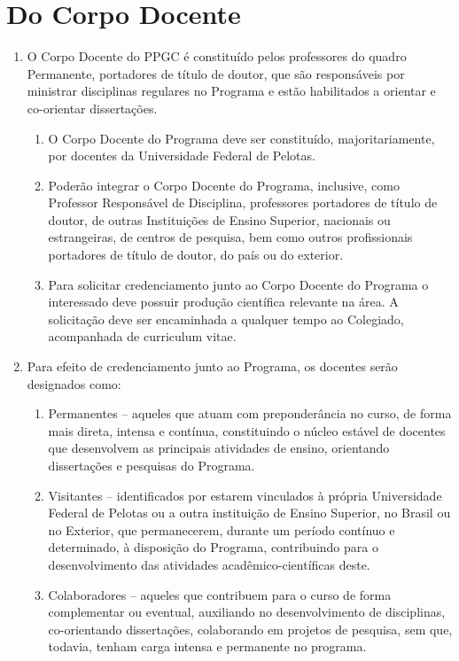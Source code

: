 \documentclass{article}
\begin{document}
\section{Do Corpo Docente}

\begin{enumerate}
	\item O Corpo Docente do PPGC é constituído pelos professores do quadro Permanente, portadores de título de doutor, que são responsáveis por ministrar disciplinas regulares no Programa e estão habilitados a orientar e co-orientar dissertações.

	\begin{enumerate}
		\item O Corpo Docente do Programa deve ser constituído, majoritariamente, por docentes da Universidade Federal de Pelotas.
		\item Poderão integrar o Corpo Docente do Programa, inclusive, como Professor Responsável de Disciplina, professores portadores de título de doutor, de outras Instituições de Ensino Superior, nacionais ou estrangeiras, de centros de pesquisa, bem como outros profissionais portadores de título de doutor, do país ou do exterior.
		\item Para solicitar credenciamento junto ao Corpo Docente do Programa o interessado deve possuir produção científica relevante na área. A solicitação deve ser encaminhada a qualquer tempo ao Colegiado, acompanhada de curriculum vitae.
	\end{enumerate}

	\item Para efeito de credenciamento junto ao Programa, os docentes serão designados como:
	\begin{enumerate}[label=\Roman*]
		\item Permanentes – aqueles que atuam com preponderância no curso, de forma mais direta, intensa e contínua, constituindo o núcleo estável de docentes que desenvolvem as principais atividades de ensino, orientando dissertações e pesquisas do Programa.
		\item Visitantes – identificados por estarem vinculados à própria Universidade Federal de Pelotas ou a outra instituição de Ensino Superior, no Brasil ou no Exterior, que permanecerem, durante um período contínuo e determinado, à disposição do Programa, contribuindo para o desenvolvimento das atividades acadêmico-científicas deste.
		\item Colaboradores – aqueles que contribuem para o curso de forma complementar ou eventual, auxiliando no desenvolvimento de disciplinas, co-orientando dissertações, colaborando em projetos de pesquisa, sem que, todavia, tenham carga intensa e permanente no programa.
	\end{enumerate}


\end{enumerate}
\end{document}
